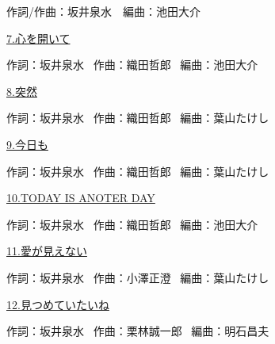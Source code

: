 \tiny{作詞/作曲：坂井泉水　編曲：池田大介}

\small{\hyperlink{7_6}{7.心を開いて}}

\tiny{作詞：坂井泉水 \ 作曲：織田哲郎 \ 編曲：池田大介}

\small{\hyperlink{7_7}{8.突然}}

\tiny{作詞：坂井泉水 \ 作曲：織田哲郎 \ 編曲：葉山たけし}

\small{\hyperlink{7_8}{9.今日も}}

\tiny{作詞：坂井泉水 \ 作曲：織田哲郎 \ 編曲：葉山たけし}

\small{\hyperlink{7_9}{10.TODAY IS ANOTER DAY}}

\tiny{作詞：坂井泉水 \ 作曲：織田哲郎 \ 編曲：池田大介}

\small{\hyperlink{7_10}{11.愛が見えない}}

\tiny{作詞：坂井泉水 \ 作曲：小澤正澄 \ 編曲：葉山たけし}

\small{\hyperlink{7_11}{12.見つめていたいね}}

\tiny{作詞：坂井泉水 \ 作曲：栗林誠一郎 \ 編曲：明石昌夫}

\small{ \ }

\tiny{ \ }


\clearpage
